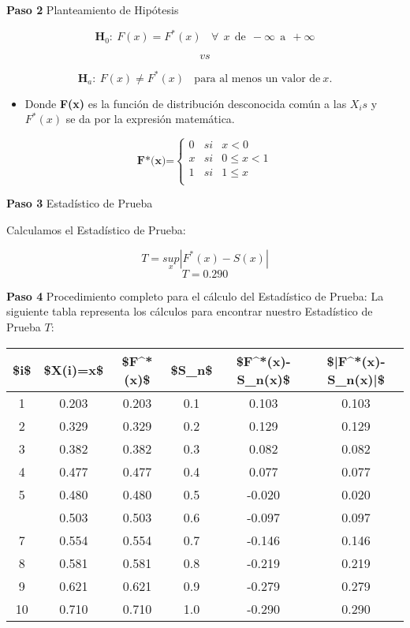 \documentclass[
  a4paper,
  oneside,
  openany]{book}
\providecommand{\tightlist}{%
  \setlength{\itemsep}{0pt}\setlength{\parskip}{0pt}}
\begin{document}
\textbf{Paso 2} Planteamiento de Hipótesis

\[\textbf{H}_0: \ F(x)=F^*(x) \ \ \ \ \forall \ \ x \ \ \mbox{de} \ \ -\infty \ \  \mbox{a} \ \  +\infty\]

\[vs\]

\[\textbf{H}_a: \ F(x) \neq F^*(x) \ \ \ \ \mbox{para al menos un  valor de} \  x.\]

\begin{itemize}
\tightlist
\item
  Donde \textbf{F(x)} es la función de distribución desconocida común a las \(X_{i}s\) y \(F^*(x)\) se da por la expresión matemática.
\end{itemize}

\[
\textbf{F*(x)=} \left\{
\begin{array}{lcc}
0 & si & x < 0 \\
x & si & 0 \leq x < 1 \\
1 & si & 1 \leq x \\
\end{array}
\right.
\]

\textbf{Paso 3} Estadístico de Prueba

Calculamos el Estadístico de Prueba:

\[T=\underset{x}{sup}|F^*(x)-S(x)|\]
\[T=0.290\]

\textbf{Paso 4} Procedimiento completo para el cálculo del Estadístico de Prueba:
La siguiente tabla representa los cálculos para encontrar nuestro Estadístico de Prueba \(T\):

\begin{table}[H]
\centering
\begin{tabular}{cccccc}
\toprule
\$i\$ & \$X(i)=x\$ & \$F\textasciicircum{}*(x)\$ & \$S\_n\$ & \$F\textasciicircum{}*(x)-S\_n(x)\$ & \$|F\textasciicircum{}*(x)-S\_n(x)|\$\\
\midrule
1 & 0.203 & 0.203 & 0.1 & 0.103 & 0.103\\
2 & 0.329 & 0.329 & 0.2 & 0.129 & 0.129\\
3 & 0.382 & 0.382 & 0.3 & 0.082 & 0.082\\
4 & 0.477 & 0.477 & 0.4 & 0.077 & 0.077\\
5 & 0.480 & 0.480 & 0.5 & -0.020 & 0.020\\
\addlinespace
6 & 0.503 & 0.503 & 0.6 & -0.097 & 0.097\\
7 & 0.554 & 0.554 & 0.7 & -0.146 & 0.146\\
8 & 0.581 & 0.581 & 0.8 & -0.219 & 0.219\\
9 & 0.621 & 0.621 & 0.9 & -0.279 & 0.279\\
10 & 0.710 & 0.710 & 1.0 & -0.290 & 0.290\\
\bottomrule
\end{tabular}
\end{table}
\end{document}
